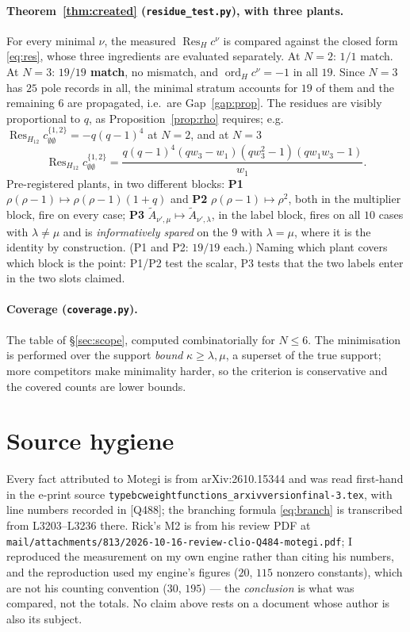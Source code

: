 \documentclass[11pt]{article}
\theoremstyle{plain}
\theoremstyle{definition}
\theoremstyle{remark}
\theoremstyle{plain}
\newcommand{\At}{\widetilde{A}}
\newcommand{\ord}{\operatorname{ord}}
\newcommand{\Res}{\operatorname{Res}}
\begin{document}
\paragraph{Theorem~\ref{thm:created} (\texttt{residue\_test.py}), with three
plants.}
For every minimal $\nu$, the measured $\Res_Hc^{\nu}$ is compared against the
closed form \eqref{eq:res}, whose three ingredients are evaluated separately.
At $N=2$: $1/1$ match.  At $N=3$: \textbf{$19/19$ match}, no mismatch, and
$\ord_Hc^{\nu}=-1$ in all $19$.  Since $N=3$ has $25$ pole records in all, the
minimal stratum accounts for $19$ of them and the remaining $6$ are propagated,
i.e.\ are Gap~\ref{gap:prop}.  The residues are visibly proportional to $q$, as
Proposition~\ref{prop:rho} requires; e.g.\
$\Res_{H_{12}}c^{\{1,2\}}_{\emptyset\emptyset}=-q(q-1)^4$ at $N=2$, and at
$N=3$
\[
\Res_{H_{12}}c^{\{1,2\}}_{\emptyset\emptyset}
=\frac{q(q-1)^4(qw_3-w_1)(qw_3^2-1)(qw_1w_3-1)}{w_1}.
\]
Pre-registered plants, in two different blocks:
\textbf{P1} $\rho(\rho-1)\mapsto\rho(\rho-1)(1+q)$ and
\textbf{P2} $\rho(\rho-1)\mapsto\rho^2$, both in the multiplier block, fire on
every case; \textbf{P3} $\At_{\nu',\mu}\mapsto\At_{\nu',\lambda}$, in the
label block, fires on all $10$ cases with $\lambda\ne\mu$ and is
\emph{informatively spared} on the $9$ with $\lambda=\mu$, where it is the
identity by construction.  (P1 and P2: $19/19$ each.)  Naming which plant covers which block is the point: P1/P2 test
the scalar, P3 tests that the two labels enter in the two slots claimed.

\paragraph{Coverage (\texttt{coverage.py}).}
The table of \S\ref{sec:scope}, computed combinatorially for $N\le6$.  The
minimisation is performed over the support \emph{bound} $\kappa\ge\lambda,\mu$,
a superset of the true support; more competitors make minimality harder, so
the criterion is conservative and the covered counts are lower bounds.

\section*{Source hygiene}

Every fact attributed to Motegi is from arXiv:2610.15344 and was read
first-hand in the e-print source
\texttt{typebcweightfunctions\_arxivversionfinal-3.tex}, with line numbers
recorded in [Q488]; the branching formula \eqref{eq:branch} is transcribed from
L3203--L3236 there.  Rick's M2 is from his review PDF at
\texttt{mail/attachments/813/2026-10-16-review-clio-Q484-motegi.pdf}; I
reproduced the measurement on my own engine rather than citing his numbers, and
the reproduction used my engine's figures ($20$, $115$ nonzero constants),
which are not his counting convention ($30$, $195$) --- the \emph{conclusion}
is what was compared, not the totals.  No claim above rests on a document whose
author is also its subject.
\end{document}
